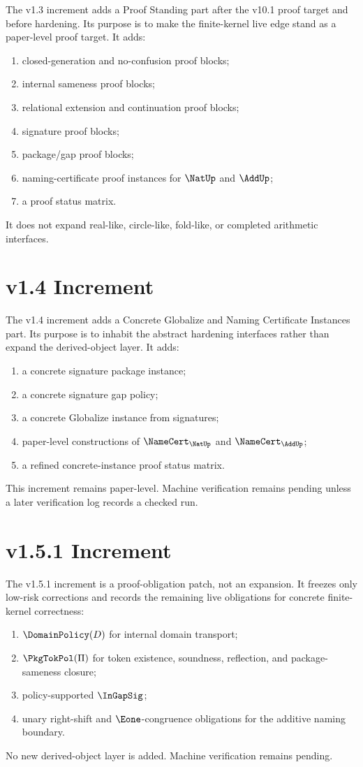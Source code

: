 The v1.3 increment adds a Proof Standing part after the v10.1 proof target and before hardening. Its purpose is to make the finite-kernel live edge stand as a paper-level proof target. It adds:
\begin{enumerate}
  \item closed-generation and no-confusion proof blocks;
  \item internal sameness proof blocks;
  \item relational extension and continuation proof blocks;
  \item signature proof blocks;
  \item package/gap proof blocks;
  \item naming-certificate proof instances for \(\NatUp\) and \(\AddUp\);
  \item a proof status matrix.
\end{enumerate}
It does not expand real-like, circle-like, fold-like, or completed arithmetic interfaces.

\section*{v1.4 Increment}

The v1.4 increment adds a Concrete Globalize and Naming Certificate Instances part. Its purpose is to inhabit the abstract hardening interfaces rather than expand the derived-object layer. It adds:
\begin{enumerate}
  \item a concrete signature package instance;
  \item a concrete signature gap policy;
  \item a concrete Globalize instance from signatures;
  \item paper-level constructions of \(\NameCert_{\NatUp}\) and \(\NameCert_{\AddUp}\);
  \item a refined concrete-instance proof status matrix.
\end{enumerate}
This increment remains paper-level. Machine verification remains pending unless a later verification log records a checked run.

\section*{v1.5.1 Increment}

The v1.5.1 increment is a proof-obligation patch, not an expansion. It freezes only low-risk corrections and records the remaining live obligations for concrete finite-kernel correctness:
\begin{enumerate}
  \item \(\DomainPolicy(D)\) for internal domain transport;
  \item \(\PkgTokPol(\Pi)\) for token existence, soundness, reflection, and package-sameness closure;
  \item policy-supported \(\InGapSig\);
  \item unary right-shift and \(\Eone\)-congruence obligations for the additive naming boundary.
\end{enumerate}
No new derived-object layer is added. Machine verification remains pending.


